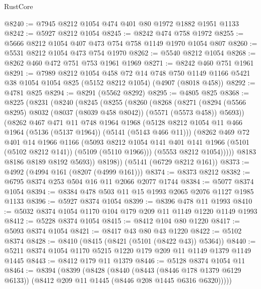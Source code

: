 \begin{lexlean}{RustCore}
\begin{coremodule}
@8240 := @7945 @8212 @1054 @474 @401 @80 @1972 @1882 @1951 @1133
@8242 := @5927 @8212 @1054
@8245 := @8242 @474 @758 @1972
@8255 := @5666 @8212 @1054 @407 @473 @754 @758 @1149 @1970 @1054 @807
@8260 := @5531 @8212 @1054 @473 @754 @1970
@8262 := @5540 @8212 @1054
@8268 := @8262 @460 @472 @751 @753 @1961 @1969
@8271 := @8242 @460 @751 @1961
@8291 := @7989
    @8212
    @1054
    @458
    @72
    @14
    @748
    @750
    @1149
    @1166
    @5421
    @38
    @1054
    @1054
    @825
    (@5152 @8212 @1054)
    (@4907 (@8018 @458))
@8292 := @4781 @825
@8294 := @8291 (@5562 @8292)
@8295 := @4805 @825
@8368 := @8225
    (@8231
      (@8240
        (@8245
          (@8255
            (@8260
              (@8268
                (@8271
                  (@8294 (@5566 @8295) @8032 (@8037 (@8039 @458 @8042)) (@5571 (@5573 @458)) @5693))
                (@8262
                  @467
                  @471
                  @11
                  @748
                  @1964
                  @1968
                  (@5128 @8212 @1054 @11 @466 @1964 (@5136 (@5137 @1964)) (@5141 (@5143 @466 @11)))
                  (@8262
                    @469
                    @72
                    @401
                    @14
                    @1966
                    @1166
                    (@5093
                      @8212
                      @1054
                      @141
                      @401
                      @141
                      @1966
                      (@5101 (@5102 @8212 @141))
                      (@5109 (@5110 @1966)))
                    (@5553 @8212 @1054)))))
            @8183
            @8186
            @8189
            @8192
            @5693))
        @8198))
    (@5141 (@6729 @8212 @161))
@8373 := @4992 (@4994 @161 (@8207 (@4999 @161)))
@8374 := @8373 @8212
@8382 := @6795 @8374 @253 @504 @16 @11 @2066 @2077 @1744
@8384 := @5077 @8374 @1054
@8394 := @8384 @478 @503 @11 @15 @1993 @2065 @2076 @1127 @1985 @1133
@8396 := @5927 @8374 @1054
@8399 := @8396 @478 @11 @1993
@8410 := @5032 @8374 @1054 @1170 @104 @179 @209 @11 @1149 @1220 @1149 @1993
@8412 := @5228 @8374 @1054
@8415 := @8412 @104 @80 @1220
@8417 := @5093 @8374 @1054
@8421 := @8417 @43 @80 @43 @1220
@8422 := @5102 @8374
@8428 := @8410 (@8415 (@8421 (@5101 (@8422 @43)) @5364))
@8440 := @5211 @8374 @1054 @1170 @5215 @1220 @179 @209 @11 @1149 @1379 @1149 @1445
@8443 := @8412 @179 @11 @1379
@8446 := @5128 @8374 @1054 @11
@8464 := @8394
    (@8399
      (@8428
        (@8440
          (@8443 (@8446 @178 @1379 @6129 @6133))
          (@8412 @209 @11 @1445 (@8446 @208 @1445 @6316 @6320)))))

\end{coremodule}
\end{lexlean}
